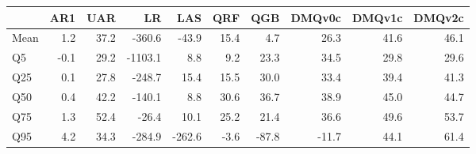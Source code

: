 \begin{tabular}{lrrrrrrrrr}
\toprule
 & AR1 & UAR & LR & LAS & QRF & QGB & DMQv0c & DMQv1c & DMQv2c \\
\midrule
Mean & 1.2 & 37.2 & -360.6 & -43.9 & 15.4 & 4.7 & 26.3 & 41.6 & 46.1 \\
Q5 & -0.1 & 29.2 & -1103.1 & 8.8 & 9.2 & 23.3 & 34.5 & 29.8 & 29.6 \\
Q25 & 0.1 & 27.8 & -248.7 & 15.4 & 15.5 & 30.0 & 33.4 & 39.4 & 41.3 \\
Q50 & 0.4 & 42.2 & -140.1 & 8.8 & 30.6 & 36.7 & 38.9 & 45.0 & 44.7 \\
Q75 & 1.3 & 52.4 & -26.4 & 10.1 & 25.2 & 21.4 & 36.6 & 49.6 & 53.7 \\
Q95 & 4.2 & 34.3 & -284.9 & -262.6 & -3.6 & -87.8 & -11.7 & 44.1 & 61.4 \\
\bottomrule
\end{tabular}
